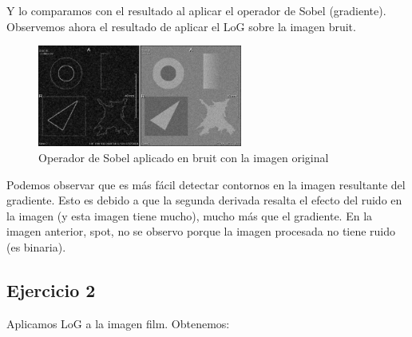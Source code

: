 \documentclass{article}
\begin{document}
Y lo comparamos con el resultado al aplicar el operador de Sobel (gradiente).\\
Observemos ahora el resultado de aplicar el LoG sobre la imagen bruit.\\
\begin{figure}[ht]
\begin{center}
    \includegraphics[width=0.6\textwidth]{3Laplaciano/3_bruit_sobel_grad.png} %
    \caption{Operador de Sobel aplicado en bruit con la imagen original}
\end{center}
\end{figure}
\FloatBarrier

Podemos observar que es más fácil detectar contornos en la imagen resultante del gradiente. 
Esto es debido a que la segunda derivada resalta el efecto del ruido en la imagen (y esta imagen tiene mucho), mucho más que el gradiente. En la imagen anterior, spot,  no se observo porque la imagen procesada no tiene ruido (es binaria).

\subsection{Ejercicio 2}

Aplicamos LoG a la imagen film. Obtenemos:
\end{document}
